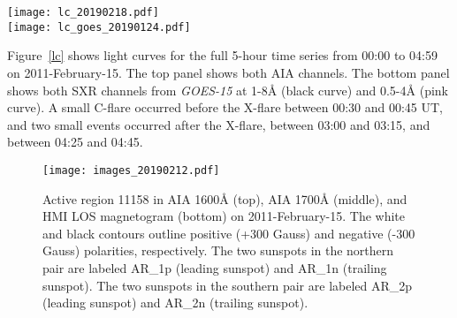\begin{figure*}[htb!]\centering
    \texttt{[image: lc\_20190218.pdf]}\\
    \texttt{[image: lc\_goes\_20190124.pdf]}
    \caption{%
        Top: Light curves of the
        UV continuum emission from AIA 1600\AA{} (blue curve) and
        AIA 1700\AA{} (red curve),
        integrated over the flare region in AR 11158.
        Bottom: Light curves observed by the \textit{GOES-15} satellite
        channels 1-8\AA{} (black curve) and 0.5-4\AA{} (pink curve),
        scaled as log(flux) to enable visibility of the increases
        during smaller events before and
        after the main X-flare.
        \label{lc}}
\end{figure*}
%

Figure~\ref{lc} shows light curves for the full 5-hour time series
from 00:00 to 04:59 on 2011-February-15.
The top panel shows both AIA channels.
The bottom panel shows both SXR channels from \textit{GOES-15} at
1-8\AA{} (black curve) and 0.5-4\AA{} (pink curve).
A small C-flare occurred before the X-flare between 00:30 and 00:45 UT, and
two small events occurred after the X-flare,
between 03:00 and 03:15, and between 04:25 and 04:45.

\begin{figure}[htb!]\centering
    \texttt{[image: images\_20190212.pdf]}
    \caption{
        Active region 11158 in
        AIA 1600\AA{} (top),
        AIA 1700\AA{} (middle), and
        HMI LOS magnetogram (bottom)
        on 2011-February-15.
        The white and black contours outline
        positive (+300 Gauss) and
        negative (-300 Gauss)
        polarities, respectively.
        The two sunspots in the northern pair are labeled AR\_1p (leading sunspot)
        and AR\_1n (trailing sunspot).
        The two sunspots in the southern pair are labeled AR\_2p (leading sunspot)
        and AR\_2n (trailing sunspot).
        \label{images}}
\end{figure}


